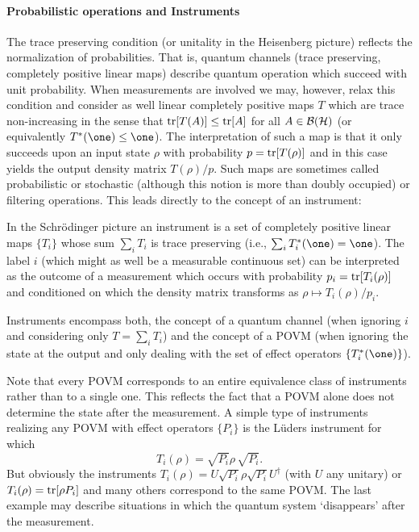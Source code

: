 \documentclass[11pt,a4paper]{article}
\theoremstyle{plain}
\theoremstyle{definition}
\theoremstyle{remark}
\numberwithin{equation}{section}
\begin{document}
\paragraph{Probabilistic operations and Instruments}
The trace preserving condition (or unitality in the Heisenberg picture) reflects the normalization of probabilities. That is, quantum channels (trace preserving, completely positive linear maps) describe quantum operation which succeed with unit probability. When measurements are involved we may, however, relax this condition and consider as well linear completely positive maps $T$ which are trace non-increasing in the sense that $\operatorname{tr}[T(A)]\le \operatorname{tr}[A]$ for all $A\in \mathcal{B}(\mathcal{H})$ (or equivalently $T^\ast(\one)\le \one$). The interpretation of such a map is that it only succeeds upon an input state $\rho$ with probability $p=\operatorname{tr}[T(\rho)]$ and in this case yields the output density matrix $T(\rho)/p$. Such maps are sometimes called probabilistic or stochastic (although this notion is more than doubly occupied) or filtering operations. This leads directly to the concept of an instrument:

In the Schr\"odinger picture an instrument is a set of completely positive linear maps $\{T_i\}$ whose sum $\sum_i T_i$ is trace preserving (i.e., $\sum_i T_i^\ast(\one)=\one$). The label $i$ (which might as well be a measurable continuous set) can be interpreted as the outcome of a measurement which occurs with probability $p_i=\operatorname{tr}[T_i(\rho)]$ and conditioned on which the density matrix transforms as $\rho\mapsto T_i(\rho)/p_i$.

Instruments encompass both, the concept of a quantum channel (when ignoring $i$ and considering only $T=\sum_i T_i$) and the concept of a POVM (when ignoring the state at the output and only dealing with the set of effect operators $\{T_i^\ast(\one)\}$).

Note that every POVM corresponds to an entire equivalence class of instruments rather than to a single one. This reflects the fact that a POVM alone does not determine the state after the measurement. A simple type of instruments realizing any POVM with effect operators $\{P_i\}$ is the L\"uders instrument for which
\begin{equation}
    T_i(\rho) = \sqrt{P_i} \rho\,\sqrt{P_i}.
\end{equation}
But obviously the instruments $T_i(\rho)=U\sqrt{P_i}\rho\sqrt{P_i}U^\dagger$ (with $U$ any unitary) or $T_i(\rho)=\operatorname{tr}[\rho P_i]$ and many others correspond to the same POVM. The last example may describe situations in which the quantum system `disappears' after the measurement.
\end{document}
